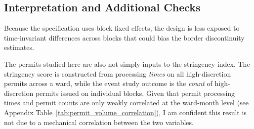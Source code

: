 \subsection{Interpretation and Additional Checks}

Because the specification uses block fixed effects, the design is less exposed to time-invariant differences across blocks that could bias the border discontinuity estimates.

The permits studied here are also not simply inputs to the stringency index.
The stringency score is constructed from processing \textit{times} on all high-discretion permits across a ward, while the event study outcome is the \textit{count} of high-discretion permits issued on individual blocks.
Given that permit processing times and permit counts are only weakly correlated at the ward-month level (see Appendix Table~\ref{tab:permit_volume_correlation}), I am confident this result is not due to a mechanical correlation between the two variables.
